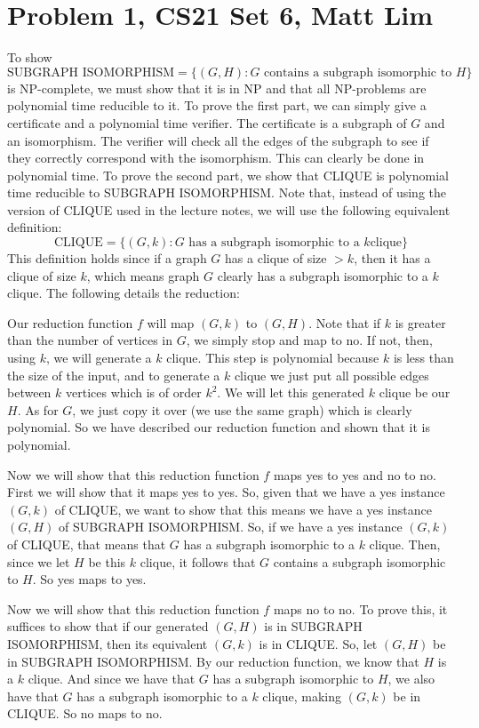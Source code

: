 \documentclass{article}
\begin{document}
\section*{Problem 1, CS21 Set 6, Matt Lim}
To show
\[ \text{SUBGRAPH ISOMORPHISM} = \{(G, H) : G \text{ contains a subgraph
isomorphic to } H\} \]
is NP-complete, we must show that it is in NP and that all NP-problems are
polynomial time reducible to it. To prove the first part, we can simply give
a certificate and a polynomial time verifier. The certificate is a subgraph of
$G$ and an isomorphism. The verifier will check all the edges of the subgraph
to see if they correctly correspond with the isomorphism. This
can clearly be done in polynomial time.
To prove the second part, we show that CLIQUE is polynomial time reducible
to SUBGRAPH ISOMORPHISM. Note that, instead of using the version of CLIQUE used
in the lecture notes, we will use the following equivalent definition:
\[ \text{CLIQUE} = \{(G,k) : G \text{ has a subgraph isomorphic to a }k \text{
clique}\} \]
This definition holds since if a graph $G$ has a clique of size $> k$, then
it has a clique of size $k$, which means
graph $G$ clearly has a subgraph isomorphic to a $k$ clique.
The following details the reduction:

Our reduction function $f$ will map $(G,k)$ to $(G,H)$. Note that if $k$ is
greater than the number of vertices in $G$, we simply stop and map to no. If
not, then, using $k$, we will generate a $k$ clique. This step is polynomial
because $k$ is less than the size of the input, and to generate a $k$ clique
we just put all possible edges between $k$ vertices which is of order $k^{2}$.
We will let this generated $k$ clique be our $H$.
As for $G$, we just copy it over (we use the same graph) which is clearly
polynomial. So we have described our reduction function and shown that it
is polynomial.

Now we will show that this reduction function $f$ maps yes to yes and no to no.
First we will show that it maps yes to yes. So, given that we have a yes
instance $(G,k)$ of CLIQUE, we want to show that this means we have a yes
instance $(G,H)$ of SUBGRAPH ISOMORPHISM. So, if we have a yes instance
$(G,k)$ of CLIQUE,
that means that $G$ has a subgraph isomorphic to a $k$ clique. Then, since we let
$H$ be this $k$ clique, it follows that $G$ contains a subgraph isomorphic to $H$.
So yes maps to yes.

Now we will show that this reduction function $f$ maps no to no. To prove this,
it suffices to show that if our generated $(G,H)$ is in SUBGRAPH ISOMORPHISM,
then its equivalent $(G,k)$ is in CLIQUE. So, let $(G,H)$ be in SUBGRAPH
ISOMORPHISM. By our reduction function, we know that $H$ is a $k$ clique. And
since we have that $G$ has a subgraph isomorphic to $H$, we also have that
$G$ has a subgraph isomorphic to a $k$ clique, making $(G,k)$ be in CLIQUE. So
no maps to no.
\end{document}
